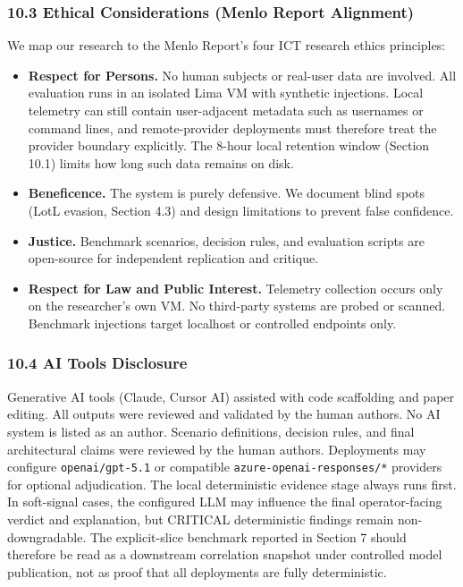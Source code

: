 \documentclass[
]{article}
\providecommand{\tightlist}{%
  \setlength{\itemsep}{0pt}\setlength{\parskip}{0pt}}
\begin{document}
\subsubsection{10.3 Ethical Considerations (Menlo Report
Alignment)}\label{ethical-considerations-menlo-report-alignment}

We map our research to the Menlo Report's four ICT research ethics
principles:

\begin{itemize}
\tightlist
\item
  \textbf{Respect for Persons.} No human subjects or real-user data are
  involved. All evaluation runs in an isolated Lima VM with synthetic
  injections. Local telemetry can still contain user-adjacent metadata
  such as usernames or command lines, and remote-provider deployments
  must therefore treat the provider boundary explicitly. The 8-hour
  local retention window (Section 10.1) limits how long such data
  remains on disk.
\item
  \textbf{Beneficence.} The system is purely defensive. We document
  blind spots (LotL evasion, Section 4.3) and design limitations to
  prevent false confidence.
\item
  \textbf{Justice.} Benchmark scenarios, decision rules, and evaluation
  scripts are open-source for independent replication and critique.
\item
  \textbf{Respect for Law and Public Interest.} Telemetry collection
  occurs only on the researcher's own VM. No third-party systems are
  probed or scanned. Benchmark injections target localhost or controlled
  endpoints only.
\end{itemize}

\subsubsection{10.4 AI Tools Disclosure}\label{ai-tools-disclosure}

Generative AI tools (Claude, Cursor AI) assisted with code scaffolding
and paper editing. All outputs were reviewed and validated by the human
authors. No AI system is listed as an author. Scenario definitions,
decision rules, and final architectural claims were reviewed by the
human authors. Deployments may configure \texttt{openai/gpt-5.1} or
compatible \texttt{azure-openai-responses/*} providers for optional
adjudication. The local deterministic evidence stage always runs first.
In soft-signal cases, the configured LLM may influence the final
operator-facing verdict and explanation, but CRITICAL deterministic
findings remain non-downgradable. The explicit-slice benchmark reported
in Section 7 should therefore be read as a downstream correlation
snapshot under controlled model publication, not as proof that all
deployments are fully deterministic.
\end{document}
